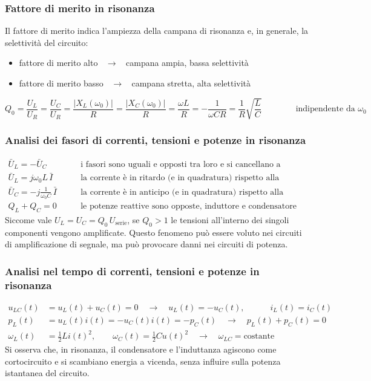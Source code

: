 \documentclass[a4paper]{article}
\begin{document}
\subsubsection*{Fattore di merito in risonanza}
Il fattore di merito indica l'ampiezza della campana di risonanza e, in generale, la selettività del circuito:
\begin{itemize}
	\item fattore di merito alto \(\;\; \rightarrow \;\;\) campana ampia, bassa selettività
	\item fattore di merito basso \(\;\; \rightarrow \;\;\) campana stretta, alta selettività
\end{itemize}

\[Q_0 = \frac{U_L}{U_R} = \frac{U_C}{U_R} = \frac{\left|X_L(\omega_0)\right|}{R} = \frac{\left|X_C(\omega_0)\right|}{R} = \frac{\omega L}{R} = -\frac{1}{\omega C R} = \frac{1}{R} \sqrt{\frac{L}{C}} \qquad\qquad \text{indipendente da } \omega_0\]

\newpage

\subsubsection*{Analisi dei fasori di correnti, tensioni e potenze in risonanza}
\begin{align*}
	\bar{U}_L = - \bar{U}_C \qquad &\text{i fasori sono uguali e opposti tra loro e si cancellano a vicenda} \\
	\bar{U}_L = j \omega_0 L \, \bar{I} \qquad &\text{la corrente è in ritardo (e in quadratura) rispetto alla tensione nell'induttanza} \\
	\bar{U}_C = - j \frac{1}{\omega_0 C} \, \bar{I} \qquad &\text{la corrente è in anticipo (e in quadratura) rispetto alla tensione nel condensatore} \\
	Q_L + Q_C = 0 \qquad &\text{le potenze reattive sono opposte, induttore e condensatore agiscono in cortocircuito}
\end{align*}
Siccome vale \(U_L = U_C = Q_0 \, U_\text{serie}\), se \(Q_0 > 1\) le tensioni all'interno dei singoli componenti vengono amplificate.
Questo fenomeno può essere voluto nei circuiti di amplificazione di segnale, ma può provocare danni nei circuiti di potenza.

\subsubsection*{Analisi nel tempo di correnti, tensioni e potenze in risonanza}
\begin{align*}
	u_{LC}(t) &= u_L(t) + u_C(t) = 0 \quad \rightarrow \quad u_L(t) = - u_C(t), \qquad\quad i_L(t) = i_C(t) \\
	p_L(t) &= u_L(t) i(t) = - u_C(t) i(t) = - p_C(t) \quad \rightarrow \quad p_L(t) + p_C(t) = 0 \\
	\omega_L(t) &= \frac{1}{2} Li(t)^2, \qquad \omega_C(t) = \frac{1}{2} Cu(t)^2 \quad \rightarrow \quad \omega_{LC} = \text{costante}
\end{align*}
Si osserva che, in risonanza, il condensatore e l'induttanza agiscono come cortocircuito e si scambiano energia a vicenda, senza
influire sulla potenza istantanea del circuito.
\end{document}
